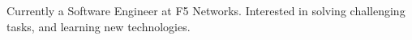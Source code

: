 

\begin{cvparagraph}

Currently a Software Engineer at F5 Networks.  Interested in solving challenging tasks, and learning new technologies.
\end{cvparagraph}
